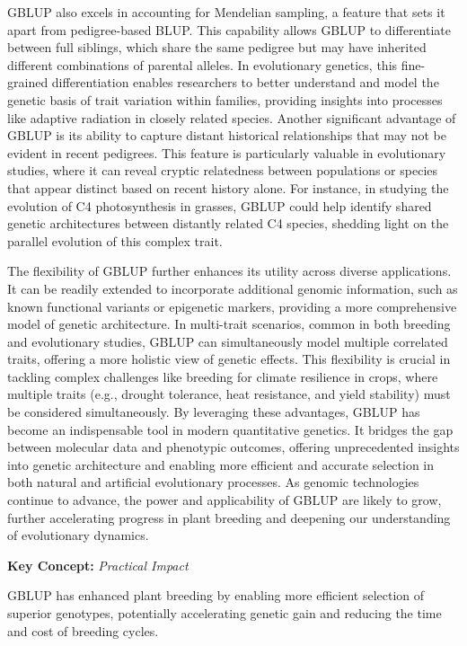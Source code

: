 \documentclass[12pt,a4paper]{article}
\newenvironment{keyconceptbox}[1][]
{\begin{basebox}[linecolor=uqblue]
\textbf{\color{uqblue}Key Concept:} \textit{#1}\par\noindent\ignorespaces}
{\end{basebox}}
\begin{document}
GBLUP also excels in accounting for Mendelian sampling, a feature that sets it apart from pedigree-based BLUP. This capability allows GBLUP to differentiate between full siblings, which share the same pedigree but may have inherited different combinations of parental alleles. In evolutionary genetics, this fine-grained differentiation enables researchers to better understand and model the genetic basis of trait variation within families, providing insights into processes like adaptive radiation in closely related species. Another significant advantage of GBLUP is its ability to capture distant historical relationships that may not be evident in recent pedigrees. This feature is particularly valuable in evolutionary studies, where it can reveal cryptic relatedness between populations or species that appear distinct based on recent history alone. For instance, in studying the evolution of C4 photosynthesis in grasses, GBLUP could help identify shared genetic architectures between distantly related C4 species, shedding light on the parallel evolution of this complex trait.

The flexibility of GBLUP further enhances its utility across diverse applications. It can be readily extended to incorporate additional genomic information, such as known functional variants or epigenetic markers, providing a more comprehensive model of genetic architecture. In multi-trait scenarios, common in both breeding and evolutionary studies, GBLUP can simultaneously model multiple correlated traits, offering a more holistic view of genetic effects. This flexibility is crucial in tackling complex challenges like breeding for climate resilience in crops, where multiple traits (e.g., drought tolerance, heat resistance, and yield stability) must be considered simultaneously. By leveraging these advantages, GBLUP has become an indispensable tool in modern quantitative genetics. It bridges the gap between molecular data and phenotypic outcomes, offering unprecedented insights into genetic architecture and enabling more efficient and accurate selection in both natural and artificial evolutionary processes. As genomic technologies continue to advance, the power and applicability of GBLUP are likely to grow, further accelerating progress in plant breeding and deepening our understanding of evolutionary dynamics.

\begin{keyconceptbox}[Practical Impact]
GBLUP has enhanced plant breeding by enabling more efficient selection of superior genotypes, potentially accelerating genetic gain and reducing the time and cost of breeding cycles.
\end{keyconceptbox}
\end{document}
